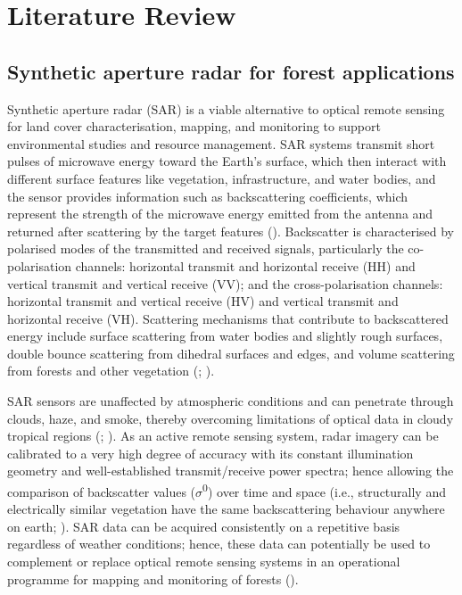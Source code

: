 
\chapter{Literature Review}
\label{cha: literature-review}

\section{Synthetic aperture radar for forest applications}
\label{sec: litrev-sar-forest-apps}

Synthetic aperture radar (SAR) is a viable alternative to optical remote sensing for land cover characterisation, mapping, and monitoring to support environmental studies and resource management. SAR systems transmit short pulses of microwave energy toward the Earth’s surface, which then interact with different surface features like vegetation, infrastructure, and water bodies, and the sensor provides information such as backscattering coefficients, which represent the strength of the microwave energy emitted from the antenna and returned after scattering by the target features (\cite{thapa_evaluation_2014}). Backscatter is characterised by polarised modes of the transmitted and received signals, particularly the co-polarisation channels: horizontal transmit and horizontal receive (HH) and vertical transmit and vertical receive (VV); and the cross-polarisation channels: horizontal transmit and vertical receive (HV) and vertical transmit and horizontal receive (VH). Scattering mechanisms that contribute to backscattered energy include surface scattering from water bodies and slightly rough surfaces, double bounce scattering from dihedral surfaces and edges, and volume scattering from forests and other vegetation (\cite{van_zyl_unsupervised_1989}; \cite{freeman_three-component_1998}).

SAR sensors are unaffected by atmospheric conditions and can penetrate through clouds, haze, and smoke, thereby overcoming limitations of optical data in cloudy tropical regions (\cite{achard_estimating_2010}; \cite{shimada_generating_2010}). As an active remote sensing system, radar imagery can be calibrated to a very high degree of accuracy with its constant illumination geometry and well-established transmit/receive power spectra; hence allowing the comparison of backscatter values ($\sigma$\textsuperscript{0}) over time and space (i.e., structurally and electrically similar vegetation have the same backscattering behaviour anywhere on earth; \cite{kellndorfer_toward_1998}). SAR data can be acquired consistently on a repetitive basis regardless of weather conditions; hence, these data can potentially be used to complement or replace optical remote sensing systems in an operational programme for mapping and monitoring of forests (\cite{almeida-filho_detecting_2007}).

